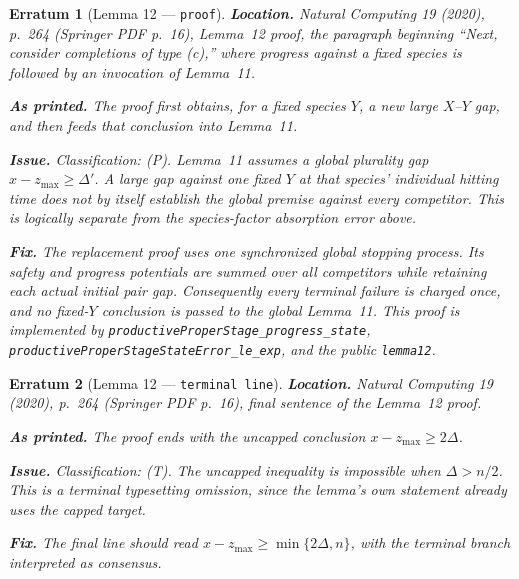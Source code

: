 \documentclass[11pt]{article}
\theoremstyle{erratumstyle}
\newtheorem{erratum}{Erratum}
\begin{document}
\begin{erratum}[Lemma 12 --- \texttt{proof}]
\textbf{Location.} \emph{Natural Computing} 19 (2020), p.~264
(Springer PDF p.~16), Lemma~12 proof, the paragraph beginning ``Next, consider
completions of type (c),'' where progress against a fixed species is followed
by an invocation of Lemma~11.

\medskip
\textbf{As printed.} The proof first obtains, for a fixed species $Y$, a new
large $X$--$Y$ gap, and then feeds that conclusion into Lemma~11.

\medskip
\textbf{Issue.} Classification: (P). Lemma~11 assumes a \emph{global}
plurality gap $x-z_{\max}\ge \Delta'$. A large gap against one fixed $Y$ at
that species' individual hitting time does not by itself establish the global
premise against every competitor. This is logically separate from the
species-factor absorption error above.

\medskip
\textbf{Fix.} The replacement proof uses one synchronized global stopping
process. Its safety and progress potentials are summed over all competitors
while retaining each actual initial pair gap. Consequently every terminal
failure is charged once, and no fixed-$Y$ conclusion is passed to the global
Lemma~11. This proof is implemented by
\texttt{productiveProperStage\_progress\_state},
\texttt{productiveProperStageStateError\_le\_exp}, and the public
\texttt{lemma12}.
\end{erratum}

\begin{erratum}[Lemma 12 --- \texttt{terminal line}]
\textbf{Location.} \emph{Natural Computing} 19 (2020), p.~264
(Springer PDF p.~16), final sentence of the Lemma~12 proof.

\medskip
\textbf{As printed.} The proof ends with the uncapped conclusion
$x-z_{\max}\ge 2\Delta$.

\medskip
\textbf{Issue.} Classification: (T). The uncapped inequality is impossible
when $\Delta>n/2$. This is a terminal typesetting omission, since the lemma's
own statement already uses the capped target.

\medskip
\textbf{Fix.} The final line should read
$x-z_{\max}\ge \min\{2\Delta,n\}$, with the terminal branch interpreted as
consensus.
\end{erratum}
\end{document}
